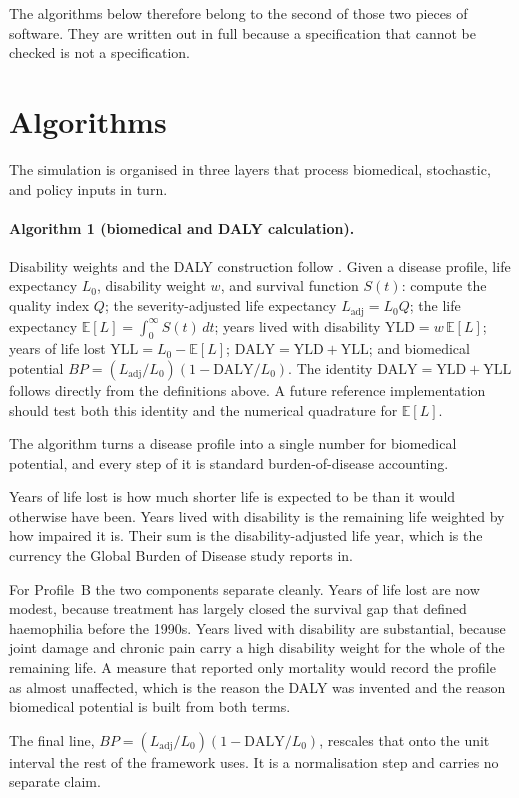 The algorithms below therefore belong to the second of those two pieces of
software. They are written out in full because a specification that cannot be
checked is not a specification.

\section{Algorithms}
\label{sec:D_algorithms}
The simulation is organised in three layers that process biomedical, stochastic,
and policy inputs in turn.

\paragraph{Algorithm 1 (biomedical and DALY calculation).}
Disability weights and the DALY construction follow \citet{gbd2019}.
Given a disease profile, life expectancy $L_0$, disability weight $w$, and
survival function $S(t)$: compute the quality index $Q$; the severity-adjusted
life expectancy $L_{\text{adj}}=L_0 Q$; the life expectancy
$\mathbb{E}[L]=\int_0^\infty S(t)\,dt$; years lived with disability
$\mathrm{YLD}=w\,\mathbb{E}[L]$; years of life lost $\mathrm{YLL}=L_0-\mathbb{E}[L]$;
$\mathrm{DALY}=\mathrm{YLD}+\mathrm{YLL}$; and biomedical potential
$BP=(L_{\text{adj}}/L_0)(1-\mathrm{DALY}/L_0)$.
The identity $\mathrm{DALY}=\mathrm{YLD}+\mathrm{YLL}$ follows directly from
the definitions above. A future reference implementation should test both this
identity and the numerical quadrature for $\mathbb{E}[L]$.

\begin{reading}
The algorithm turns a disease profile into a single number for biomedical
potential, and every step of it is standard burden-of-disease accounting.

Years of life lost is how much shorter life is expected to be than it would
otherwise have been. Years lived with disability is the remaining life weighted
by how impaired it is. Their sum is the disability-adjusted life year, which is
the currency the Global Burden of Disease study reports in.

For Profile~B the two components separate cleanly. Years of life lost are now
modest, because treatment has largely closed the survival gap that defined
haemophilia before the 1990s. Years lived with disability are substantial,
because joint damage and chronic pain carry a high disability weight for the
whole of the remaining life. A measure that reported only mortality would
record the profile as almost unaffected, which is the reason the DALY was
invented and the reason biomedical potential is built from both terms.

The final line, $BP=(L_{\text{adj}}/L_0)(1-\mathrm{DALY}/L_0)$, rescales that
onto the unit interval the rest of the framework uses. It is a normalisation
step and carries no separate claim.
\end{reading}

